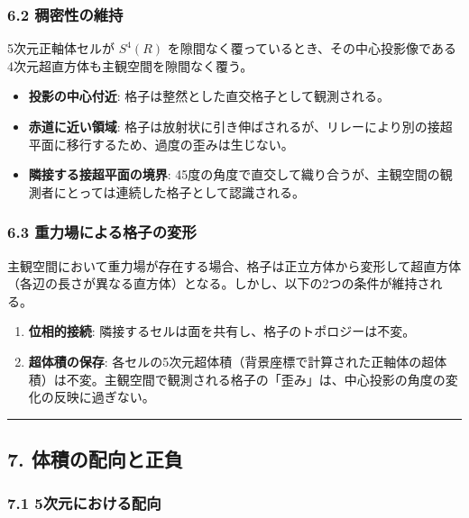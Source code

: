 \documentclass[a4paper,11pt]{ltjsarticle}
\providecommand{\tightlist}{\setlength{\itemsep}{0pt}\setlength{\parskip}{0pt}}
\begin{document}
\subsubsection{6.2
稠密性の維持}\label{ux7a20ux5bc6ux6027ux306eux7dadux6301}

5次元正軸体セルが \(S^4(R)\)
を隙間なく覆っているとき、その中心投影像である4次元超直方体も主観空間を隙間なく覆う。

\begin{itemize}
\tightlist
\item
  \textbf{投影の中心付近}: 格子は整然とした直交格子として観測される。
\item
  \textbf{赤道に近い領域}:
  格子は放射状に引き伸ばされるが、リレーにより別の接超平面に移行するため、過度の歪みは生じない。
\item
  \textbf{隣接する接超平面の境界}:
  45度の角度で直交して織り合うが、主観空間の観測者にとっては連続した格子として認識される。
\end{itemize}

\subsubsection{6.3
重力場による格子の変形}\label{ux91cdux529bux5834ux306bux3088ux308bux683cux5b50ux306eux5909ux5f62}

主観空間において重力場が存在する場合、格子は正立方体から変形して超直方体（各辺の長さが異なる直方体）となる。しかし、以下の2つの条件が維持される。

\begin{enumerate}
\def\labelenumi{\arabic{enumi}.}
\tightlist
\item
  \textbf{位相的接続}:
  隣接するセルは面を共有し、格子のトポロジーは不変。
\item
  \textbf{超体積の保存}:
  各セルの5次元超体積（背景座標で計算された正軸体の超体積）は不変。主観空間で観測される格子の「歪み」は、中心投影の角度の変化の反映に過ぎない。
\end{enumerate}

\begin{center}\rule{0.5\linewidth}{0.5pt}\end{center}

\subsection{7.
体積の配向と正負}\label{ux4f53ux7a4dux306eux914dux5411ux3068ux6b63ux8ca0}

\subsubsection{7.1
5次元における配向}\label{ux6b21ux5143ux306bux304aux3051ux308bux914dux5411}
\end{document}
